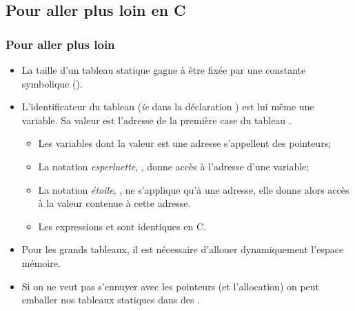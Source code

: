 \documentclass[xcolor=pdftex,svgnames,table]{beamer}
\begin{document}
\subsection{Pour aller plus loin en C}
\begin{frame}
  \frametitle{Pour aller plus loin\nowrite}

\begin{itemize}
\item La taille d'un tableau statique gagne à être fixée par une constante symbolique ().
\pause
\item L'identificateur du tableau (\emph{ie}  dans la déclaration ) est lui même une variable. Sa valeur est l'adresse de la première case du tableau .
\pause
  \begin{itemize}
  \item  Les variables dont la valeur est une adresse s'appellent des \alert{pointeurs}; 
\item La notation \emph{esperluette}, , donne accès à l'adresse d'une variable;
\item La notation \emph{étoile}, , ne s'applique qu'à une adresse, elle donne alors accès à la valeur contenue à cette adresse. 
\item Les expressions  et   sont identiques en
  C.
  \end{itemize}\pause
\item Pour les grands tableaux, il est nécessaire d'allouer dynamiquement l'espace mémoire.\pause
\item Si on ne veut pas s'ennuyer avec les pointeurs (et l'allocation)
  on peut emballer nos tableaux statiques dans des .

\end{itemize}
\end{frame}
\end{document}
